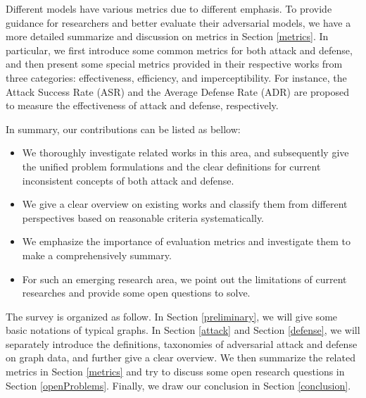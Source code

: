 Different models have various metrics due to different emphasis. To provide guidance for researchers and better evaluate their adversarial models, we have a more detailed summarize and discussion on metrics in Section \ref{metrics}. In particular, we first introduce some common metrics for both attack and defense, and then present some special metrics provided in their respective works from three categories: effectiveness, efficiency, and imperceptibility. For instance, the Attack Success Rate (ASR) \cite{chen2018link} and the Average Defense Rate (ADR) \cite{chen2019can} are proposed to measure the effectiveness of attack and defense, respectively.

In summary, our contributions can be listed as bellow:
\begin{itemize}
	\item We thoroughly investigate related works in this area, and subsequently give the unified problem formulations and the clear definitions for current inconsistent concepts of both attack and defense.
	\item We give a clear overview on existing works and classify them from different perspectives based on reasonable criteria systematically.
	\item We emphasize the importance of evaluation metrics and investigate them to make a comprehensively summary.
	\item For such an emerging research area, we point out the limitations of current researches and provide some open questions to solve.

\end{itemize}
The survey is organized as follow. In Section \ref{preliminary}, we will give some basic notations of typical graphs. In Section \ref{attack} and Section \ref{defense}, we will separately introduce the definitions, taxonomies of adversarial attack and defense on graph data, and further give a clear overview. We then summarize the related metrics in Section \ref{metrics} and try to discuss some open research questions in Section \ref{openProblems}. Finally, we draw our conclusion in Section \ref{conclusion}.

